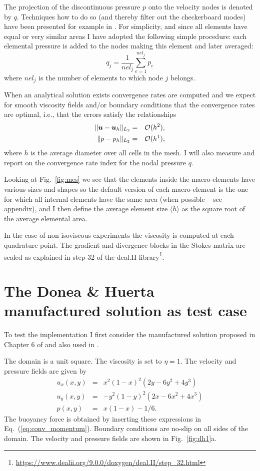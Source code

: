 \documentclass[a4paper,12pt]{article}
\begin{document}
The projection of the discontinuous pressure $p$ onto the velocity nodes is denoted by $q$. 
Techniques how to do so (and thereby filter out the checkerboard modes) have been presented 
for example in \cite{chpc95,legs79,thfb08}.
For simplicity, and since all elements have equal or very similar areas 
I have adopted the following simple procedure: each 
elemental pressure is added to the nodes making this element and later averaged:
\[
q_j = \frac{1}{nel_j} \sum_{e=1}^{nel_j} p_e
\]
where $nel_j$ is the number of elements to which node $j$ belongs.

When an analytical solution exists convergence rates are computed and 
we expect for smooth viscosity fields and/or boundary conditions that the convergence rates 
are optimal, i.e., that the errors satisfy the relationships
\begin{eqnarray}
\| {\bm u} - {\bm u}_h \|_{L_2} &=&  {\cal O}(h^{2}),     \\  
\| p - p_h \|_{L_2}   &=& {\cal O}(h^{1}),
  \label{eq:error-rates}
\end{eqnarray}
where $h$ is the average diameter over all cells in the mesh.
I will also measure and report on the convergence rate index for the nodal pressure $q$.

Looking at Fig.~\ref{fig:mes} we see that the elements inside the macro-elements 
have various sizes and shapes so 
the default version of each macro-element is the one for which all internal elements have the same area
(when possible -- see appendix), and I then define the average element size
$\langle h \rangle$ as the square root of the average elemental area.

In the case of non-isoviscous experiments the viscosity is computed at each 
quadrature point. The gradient and divergence blocks in the Stokes matrix are
scaled as explained in step 32 of the deal.II library\footnote{\url{https://www.dealii.org/9.0.0/doxygen/deal.II/step_32.html}}.

\section{The Donea \& Huerta manufactured solution as test case}

To test the implementation I first consider the manufactured solution 
proposed in Chapter 6 of \cite{dohu03} and also used in \cite{thba22,thba25}.
 
The domain is a unit square. The viscosity is set to $\eta=1$.
The velocity and pressure fields are given by
\begin{eqnarray}
u_x(x,y) &=& x^2(1- x)^2 (2y - 6y^2 + 4y^3)  \\
u_y(x,y) &=& -y^2 (1 - y)^2 (2x - 6x^2 + 4x^3) \\
p(x,y) &=& x(1 -x)- 1/6. 
\end{eqnarray}
The buoyancy force is obtained by inserting these expressions in Eq.~(\ref{eq:conv_momentum}).
Boundary conditions are no-slip on all sides of the domain.
The velocity and pressure fields are shown in Fig.~\ref{fig:dh1}a.
\end{document}
